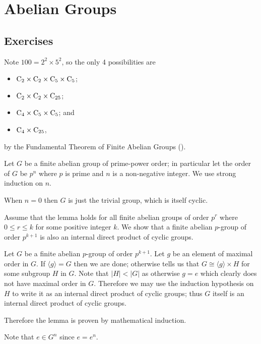 \section{Abelian Groups}
\subsection*{Exercises}
\begin{questions}
    \item Note $100 = 2^2 \times 5^2$, so the only 4 possibilities are
    \begin{itemize}
        \item $\mathrm{C}_{2} \times \mathrm{C}_{2} \times \mathrm{C}_{5} \times \mathrm{C}_{5}$;
        \item $\mathrm{C}_{2} \times \mathrm{C}_{2} \times \mathrm{C}_{25}$;
        \item $\mathrm{C}_{4} \times \mathrm{C}_{5} \times \mathrm{C}_{5}$; and
        \item $\mathrm{C}_{4} \times \mathrm{C}_{25}$,
    \end{itemize}
    by the Fundamental Theorem of Finite Abelian Groups ().

    \item Let $G$ be a finite abelian group of prime-power order; in particular let the order of $G$ be $p^n$ where $p$ is prime and $n$ is a non-negative integer. We use strong induction on $n$.

    When $n = 0$ then $G$ is just the trivial group, which is itself cyclic.

    Assume that the lemma holds for all finite abelian groups of order $p^r$ where $0 \leq r \leq k$ for some positive integer $k$. We show that a finite abelian $p$-group of order $p^{k+1}$ is also an internal direct product of cyclic groups.

    Let $G$ be a finite abelian $p$-group of order $p^{k+1}$. Let $g$ be an element of maximal order in $G$. If $\langle g \rangle = G$ then we are done; otherwise  tells us that $G \cong \langle g \rangle \times H$ for some subgroup $H$ in $G$. Note that $|H| < |G|$ as otherwise $g = e$ which clearly does not have maximal order in $G$. Therefore we may use the induction hypothesis on $H$ to write it as an internal direct product of cyclic groups; thus $G$ itself is an internal direct product of cyclic groups.

    Therefore the lemma is proven by mathematical induction.

    \item \begin{partquestions}{\roman*}
        \item Note that $e \in G^n$ since $e = e^n$.


\end{partquestions}
\end{questions}
